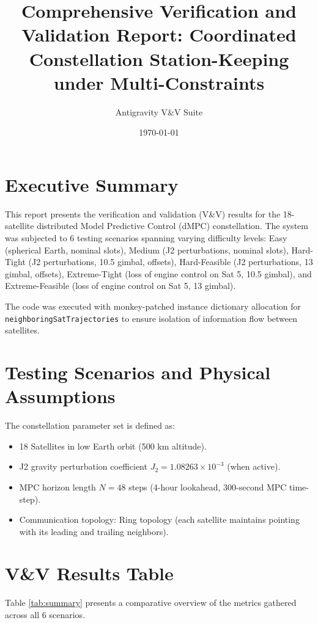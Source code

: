 \documentclass{article}
\title{Comprehensive Verification and Validation Report: Coordinated Constellation Station-Keeping under Multi-Constraints}
\author{Antigravity V\&V Suite}
\date{\today}
\begin{document}
\maketitle

\section{Executive Summary}
This report presents the verification and validation (V\&V) results for the 18-satellite distributed Model Predictive Control (dMPC) constellation. The system was subjected to 6 testing scenarios spanning varying difficulty levels: Easy (spherical Earth, nominal slots), Medium (J2 perturbations, nominal slots), Hard-Tight (J2 perturbations, 10.5\textdegree{} gimbal, offsets), Hard-Feasible (J2 perturbations, 13\textdegree{} gimbal, offsets), Extreme-Tight (loss of engine control on Sat 5, 10.5\textdegree{} gimbal), and Extreme-Feasible (loss of engine control on Sat 5, 13\textdegree{} gimbal).

The code was executed with monkey-patched instance dictionary allocation for \texttt{neighboringSatTrajectories} to ensure isolation of information flow between satellites.

\section{Testing Scenarios and Physical Assumptions}
The constellation parameter set is defined as:
\begin{itemize}
    \item 18 Satellites in low Earth orbit (500 km altitude).
    \item J2 gravity perturbation coefficient $J_2 = 1.08263 \times 10^{-3}$ (when active).
    \item MPC horizon length $N = 48$ steps (4-hour lookahead, 300-second MPC time-step).
    \item Communication topology: Ring topology (each satellite maintains pointing with its leading and trailing neighbors).
\end{itemize}

\section{V\&V Results Table}
Table \ref{tab:summary} presents a comparative overview of the metrics gathered across all 6 scenarios.
\end{document}
